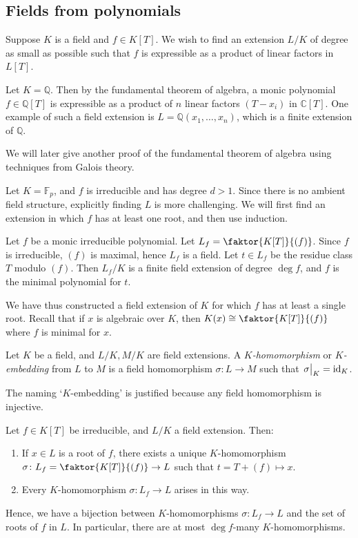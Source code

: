 \subsection{Fields from polynomials}
Suppose \( K \) is a field and \( f \in K[T] \).
We wish to find an extension \( L / K \) of degree as small as possible such that \( f \) is expressible as a product of linear factors in \( L[T] \).
\begin{example}
	Let \( K = \mathbb Q \).
	Then by the fundamental theorem of algebra, a monic polynomial \( f \in \mathbb Q[T] \) is expressible as a product of \( n \) linear factors \( (T - x_i) \) in \( \mathbb C[T] \).
	One example of such a field extension is \( L = \mathbb Q(x_1, \dots, x_n) \), which is a finite extension of \( \mathbb Q \).
\end{example}
We will later give another proof of the fundamental theorem of algebra using techniques from Galois theory.
\begin{example}
	Let \( K = \mathbb F_p \), and \( f \) is irreducible and has degree \( d > 1 \).
	Since there is no ambient field structure, explicitly finding \( L \) is more challenging.
	We will first find an extension in which \( f \) has at least one root, and then use induction.
\end{example}
\begin{theorem}
	Let \( f \) be a monic irreducible polynomial.
	Let \( L_f = \faktor{K[T]}{(f)} \).
	Since \( f \) is irreducible, \( (f) \) is maximal, hence \( L_f \) is a field.
	Let \( t \in L_f \) be the residue class \( T \) modulo \( (f) \).
	Then \( L_f/K \) is a finite field extension of degree \( \deg f \), and \( f \) is the minimal polynomial for \( t \).
\end{theorem}
We have thus constructed a field extension of \( K \) for which \( f \) has at least a single root.
Recall that if \( x \) is algebraic over \( K \), then \( K(x) \cong \faktor{K[T]}{(f)} \) where \( f \) is minimal for \( x \).
\begin{definition}
	Let \( K \) be a field, and \( L / K, M / K \) are field extensions.
	A \emph{\( K \)-homomorphism} or \emph{\( K \)-embedding} from \( L \) to \( M \) is a field homomorphism \( \sigma \colon L \to M \) such that \( \eval{\sigma}_K = \mathrm{id}_K \).
\end{definition}
The naming `\( K \)-embedding' is justified because any field homomorphism is injective.
\begin{theorem}
	Let \( f \in K[T] \) be irreducible, and \( L / K \) a field extension.
	Then:
	\begin{enumerate}
		\item If \( x \in L \) is a root of \( f \), there exists a unique \( K \)-homomorphism \( \sigma \colon L_f = \faktor{K[T]}{(f)} \to L \) such that \( t = T + (f) \mapsto x \).
		\item Every \( K \)-homomorphism \( \sigma \colon L_f \to L \) arises in this way.
	\end{enumerate}
	Hence, we have a bijection between \( K \)-homomorphisms \( \sigma \colon L_f \to L \) and the set of roots of \( f \) in \( L \).
	In particular, there are at most \( \deg f \)-many \( K \)-homomorphisms.
\end{theorem}
